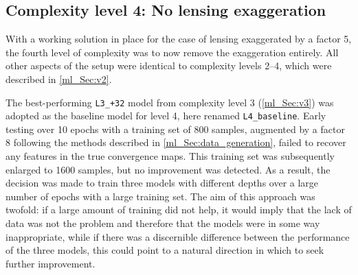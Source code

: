 \subsection{Complexity level 4: No lensing exaggeration}
\label{ml_Sec:v4}

With a working solution in place for the case of lensing exaggerated by a factor 5, the fourth level of complexity was to now remove the exaggeration entirely. All other aspects of the setup were identical to complexity levels 2--4, which were described in \autoref{ml_Sec:v2}.

The best-performing \texttt{L3\_+32} model from complexity level 3 (\autoref{ml_Sec:v3}) was adopted as the baseline model for level 4, here renamed \texttt{L4\_baseline}. Early testing over 10 epochs with a training set of 800 samples, augmented by a factor 8 following the methods described in \autoref{ml_Sec:data_generation}, failed to recover any features in the true convergence maps. This training set was subsequently enlarged to 1600 samples, but no improvement was detected. As a result, the decision was made to train three models with different depths over a large number of epochs with a large training set. The aim of this approach was twofold: if a large amount of training did not help, it would imply that the lack of data was not the problem and therefore that the models were in some way inappropriate, while if there was a discernible difference between the performance of the three models, this could point to a natural direction in which to seek further improvement.

